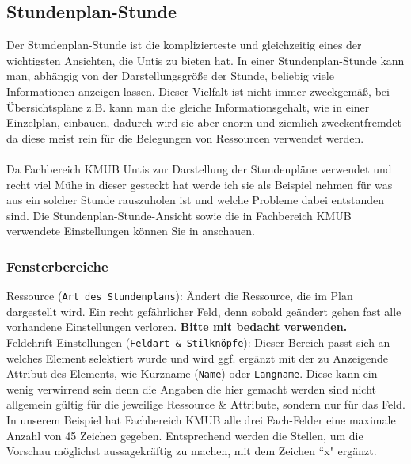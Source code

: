 \subsection{Stundenplan-Stunde}
\label{sec:stundenplan-stunde}

Der Stundenplan-Stunde ist die komplizierteste und gleichzeitig eines der wichtigsten Ansichten, die Untis zu bieten hat. In einer Stundenplan-Stunde kann man, abhängig von der Darstellungsgröße der Stunde, beliebig viele Informationen anzeigen lassen. Dieser Vielfalt ist nicht immer zweckgemäß, bei Übersichtspläne z.B. kann man die gleiche Informationsgehalt, wie in einer Einzelplan, einbauen, dadurch wird sie aber enorm und ziemlich zweckentfremdet da diese meist rein für die Belegungen von Ressourcen verwendet werden.\\
\\
Da Fachbereich KMUB Untis zur Darstellung der Stundenpläne verwendet und recht viel Mühe in dieser gesteckt hat werde ich sie als Beispiel nehmen für was aus ein solcher Stunde rauszuholen ist und welche Probleme dabei entstanden sind. Die Stundenplan-Stunde-Ansicht sowie die in Fachbereich KMUB verwendete Einstellungen können Sie in  anschauen.

\subsubsection{Fensterbereiche}

\noindent
Ressource (\texttt{Art des Stundenplans}): Ändert die Ressource, die im Plan dargestellt wird. Ein recht gefährlicher Feld, denn sobald geändert gehen fast alle vorhandene Einstellungen verloren. \textbf{Bitte mit bedacht verwenden.}\\

\noindent
Feldchrift Einstellungen (\texttt{Feldart \& Stilknöpfe}): Dieser Bereich passt sich an welches Element selektiert wurde und wird ggf. ergänzt mit der zu Anzeigende Attribut des Elements, wie Kurzname (\texttt{Name}) oder \texttt{Langname}. Diese kann ein wenig verwirrend sein denn die Angaben die hier gemacht werden sind nicht allgemein gültig für die jeweilige Ressource \& Attribute, sondern nur für das Feld. In unserem Beispiel hat Fachbereich KMUB alle drei Fach-Felder eine maximale Anzahl von 45 Zeichen gegeben. Entsprechend werden die Stellen, um die Vorschau möglichst aussagekräftig zu machen, mit dem Zeichen ``x" \hspace{1pt} ergänzt.\\


